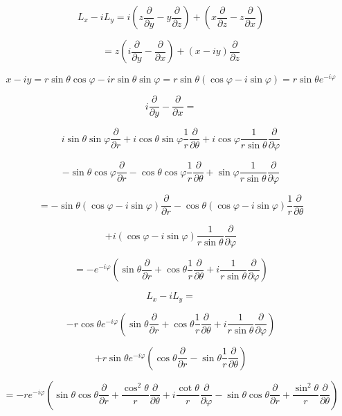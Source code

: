 \documentclass[12pt]{article}
\begin{document}
\[
    L_x - i L_y = i \left(z \frac{\partial}{\partial y} - y \frac{\partial}{\partial z}\right)
    + \left(x \frac{\partial}{\partial z} - z \frac{\partial}{\partial x}\right)
\]

\[
    = z \left(i \frac{\partial}{\partial y} - \frac{\partial}{\partial x}\right) + \left( x - i y\right)
    \frac{\partial}{\partial z}
\]

\[
    x - i y = r \sin{\theta} \cos{\varphi} - i r \sin{\theta} \sin{\varphi} = r \sin{\theta}
    \left(\cos{\varphi} - i \sin{\varphi}\right) = r \sin{\theta} e^{-i \varphi}
\]

\[
    i \frac{\partial}{\partial y} - \frac{\partial}{\partial x} =
\]

\[
    i  \sin{\theta} \sin{\varphi} \frac{\partial}{\partial r}
    + i \cos{\theta} \sin{\varphi} \frac{1}{r} \frac{\partial}{\partial \theta}
    + i \cos{\varphi} \frac{1}{r \sin{\theta}} \frac{\partial}{\partial \varphi}
\]

\[
    - \sin{\theta} \cos{\varphi} \frac{\partial}{\partial r}
    - \cos{\theta} \cos{\varphi} \frac{1}{r} \frac{\partial}{\partial \theta}
    + \sin{\varphi} \frac{1}{r \sin{\theta}} \frac{\partial}{\partial \varphi}
\]

\[
    = -\sin{\theta} \left(\cos{\varphi} - i \sin{\varphi}\right) \frac{\partial}{\partial r}
    - \cos{\theta} \left(\cos{\varphi} - i \sin{\varphi}\right) \frac{1}{r} \frac{\partial}{\partial \theta}
\]

\[
    + i \left(\cos{\varphi} - i \sin{\varphi}\right) \frac{1}{r \sin{\theta}} \frac{\partial}{\partial \varphi}
\]

\[
    = - e^{-i \varphi}
    \left(
    \sin{\theta} \frac{\partial}{\partial r}
    + \cos{\theta} \frac{1}{r} \frac{\partial}{\partial \theta}
    + i \frac{1}{r \sin{\theta}} \frac{\partial}{\partial \varphi}
    \right)
\]

\[
    L_x - i L_y =
\]

\[
    - r \cos{\theta} e^{-i \varphi}
    \left(
    \sin{\theta} \frac{\partial}{\partial r}
    + \cos{\theta} \frac{1}{r} \frac{\partial}{\partial \theta}
    + i \frac{1}{r \sin{\theta}} \frac{\partial}{\partial \varphi}
    \right)
\]

\[
    + r \sin{\theta} e^{-i \varphi}
    \left(
    \cos{\theta} \frac{\partial}{\partial r} - \sin{\theta} \frac{1}{r} \frac{\partial}{\partial \theta}
    \right)
\]

\[
    = - r e^{-i \varphi}
    \left(
    \sin{\theta} \cos{\theta} \frac{\partial}{\partial r}
    + \frac{\cos^2{\theta}}{r} \frac{\partial}{\partial \theta}
    + i \frac{\cot{\theta}}{r}\frac{\partial}{\partial \varphi}
    - \sin{\theta} \cos{\theta} \frac{\partial}{\partial r}
    + \frac{\sin^2{\theta}}{r} \frac{\partial}{\partial \theta}
    \right)
\]
\end{document}
